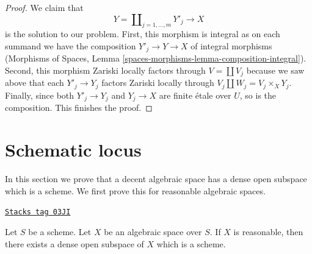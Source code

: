 \begin{proof}
\medskip\noindent
We claim that
$$
Y = \coprod\nolimits_{j = 1, \ldots, m} Y'_j \longrightarrow X
$$
is the solution to our problem. First, this morphism is integral
as on each summand we have the composition $Y'_j \to Y \to X$
of integral morphisms (Morphisms of Spaces, Lemma
\ref{spaces-morphisms-lemma-composition-integral}). Second, this
morphism Zariski locally factors through $V = \coprod V_j$ because
we saw above that each $Y'_j \to Y_j$ factors Zariski locally through
$V_j \amalg W_j = V_j \times_X Y_j$. Finally, since both
$Y'_j \to Y_j$ and $Y_j \to X$ are finite \'etale over
$U$, so is the composition. This finishes the proof.
\end{proof}

\section{Schematic locus}
\label{decent-spaces-section-schematic}
In this section we prove that a decent algebraic space has a dense open
subspace which is a scheme. We first prove this for reasonable algebraic
spaces.


\begin{proposition}
\label{decent-spaces-proposition-reasonable-open-dense-scheme}
\href{https://stacks.math.columbia.edu/tag/03JI}{\texttt{Stacks tag 03JI}}

Let $S$ be a scheme. Let $X$ be an algebraic space over $S$.
If $X$ is reasonable, then there exists a dense open subspace
of $X$ which is a scheme.
\end{proposition}

